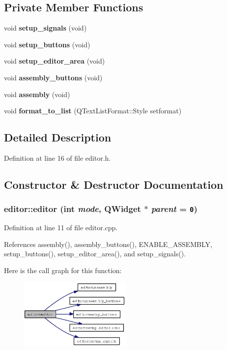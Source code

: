 \subsection*{Private Member Functions}
\begin{CompactItemize}
\item 
void {\bf setup\_\-signals} (void)
\item 
void {\bf setup\_\-buttons} (void)
\item 
void {\bf setup\_\-editor\_\-area} (void)
\item 
void {\bf assembly\_\-buttons} (void)
\item 
void {\bf assembly} (void)
\item 
void {\bf format\_\-to\_\-list} (QText\-List\-Format::Style setformat)
\end{CompactItemize}


\subsection{Detailed Description}




Definition at line 16 of file editor.h.

\subsection{Constructor \& Destructor Documentation}
\subsubsection{\setlength{\rightskip}{0pt plus 5cm}editor::editor (int {\em mode}, QWidget $\ast$ {\em parent} = {\tt 0})}\label{classeditor_03b21bef6caff60e20b8fe753b7625a9}




Definition at line 11 of file editor.cpp.

References assembly(), assembly\_\-buttons(), ENABLE\_\-ASSEMBLY, setup\_\-buttons(), setup\_\-editor\_\-area(), and setup\_\-signals().

Here is the call graph for this function:\begin{figure}[H]
\begin{center}
\leavevmode
\includegraphics[width=155pt]{classeditor_03b21bef6caff60e20b8fe753b7625a9_cgraph}
\end{center}
\end{figure}
